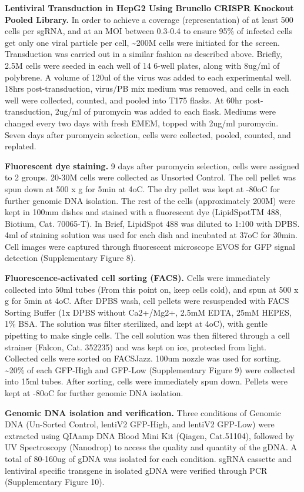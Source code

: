 \documentclass[
  a4paper,
]{article}
\begin{document}
\textbf{Lentiviral Transduction in HepG2 Using Brunello CRISPR Knockout Pooled Library.}
In order to achieve a coverage (representation) of at least 500 cells per sgRNA, and at an MOI between 0.3-0.4 to ensure 95\% of infected cells get only one viral particle per cell, \textasciitilde200M cells were initiated for the screen.
Transduction was carried out in a similar fashion as described above.
Briefly, 2.5M cells were seeded in each well of 14 6-well plates, along with 8ug/ml of polybrene.
A volume of 120ul of the virus was added to each experimental well.
18hrs post-transduction, virus/PB mix medium was removed, and cells in each well were collected, counted, and pooled into T175 flasks.
At 60hr post-transduction, 2ug/ml of puromycin was added to each flask.
Mediums were changed every two days with fresh EMEM, topped with 2ug/ml puromycin.
Seven days after puromycin selection, cells were collected, pooled, counted, and replated.

\textbf{Fluorescent dye staining.}
9 days after puromycin selection, cells were assigned to 2 groups.
20-30M cells were collected as Unsorted Control.
The cell pellet was spun down at 500 x g for 5min at 4oC.
The dry pellet was kept at -80oC for further genomic DNA isolation.
The rest of the cells (approximately 200M) were kept in 100mm dishes and stained with a fluorescent dye (LipidSpotTM 488, Biotium, Cat. 70065-T).
In Brief, LipidSpot 488 was diluted to 1:100 with DPBS.
4ml of staining solution was used for each dish and incubated at 37oC for 30min.
Cell images were captured through fluorescent microscope EVOS for GFP signal detection (Supplementary Figure 8).

\textbf{Fluorescence-activated cell sorting (FACS).}
Cells were immediately collected into 50ml tubes (From this point on, keep cells cold), and spun at 500 x g for 5min at 4oC.
After DPBS wash, cell pellets were resuspended with FACS Sorting Buffer (1x DPBS without Ca2+/Mg2+, 2.5mM EDTA, 25mM HEPES, 1\% BSA.
The solution was filter sterilized, and kept at 4oC), with gentle pipetting to make single cells.
The cell solution was then filtered through a cell strainer (Falcon, Cat. 352235) and was kept on ice, protected from light.
Collected cells were sorted on FACSJazz.
100um nozzle was used for sorting.
\textasciitilde20\% of each GFP-High and GFP-Low (Supplementary Figure 9) were collected into 15ml tubes.
After sorting, cells were immediately spun down.
Pellets were kept at -80oC for further genomic DNA isolation.

\textbf{Genomic DNA isolation and verification.}
Three conditions of Genomic DNA (Un-Sorted Control, lentiV2 GFP-High, and lentiV2 GFP-Low) were extracted using QIAamp DNA Blood Mini Kit (Qiagen, Cat.51104), followed by UV Spectroscopy (Nanodrop) to access the quality and quantity of the gDNA.
A total of 80-160ug of gDNA was isolated for each condition.
sgRNA cassette and lentiviral specific transgene in isolated gDNA were verified through PCR (Supplementary Figure 10).
\end{document}
